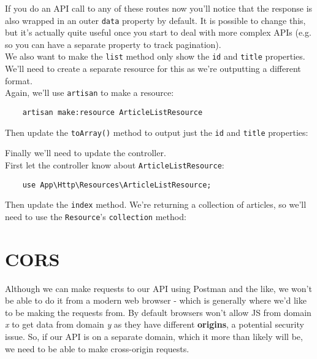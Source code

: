 If you do an API call to any of these routes now you'll notice that the response is also wrapped in an outer \texttt{data} property by default. It is possible to change this, but it's actually quite useful once you start to deal with more complex APIs (e.g. so you can have a separate property to track pagination).
\\

We also want to make the \texttt{list} method only show the \texttt{id} and \texttt{title} properties. We'll need to create a separate resource for this as we're outputting a different format.
\\

Again, we'll use \texttt{artisan} to make a resource:

\begin{verbatim}
    artisan make:resource ArticleListResource
\end{verbatim}

Then update the \texttt{toArray()} method to output just the \texttt{id} and \texttt{title} properties:


Finally we'll need to update the controller.
\\

First let the controller know about \texttt{ArticleListResource}:

\begin{verbatim}
    use App\Http\Resources\ArticleListResource;
\end{verbatim}

Then update the \texttt{index} method. We're returning a collection of articles, so we'll need to use the \texttt{Resource}'s \texttt{collection} method:




\section{CORS}

Although we can make requests to our API using Postman and the like, we won't be able to do it from a modern web browser - which is generally where we'd like to be making the requests from. By default browsers won't allow JS from domain \textit{x} to get data from domain \textit{y} as they have different \textbf{origins}, a potential security issue. So, if our API is on a separate domain, which it more than likely will be, we need to be able to make cross-origin requests.
\\

